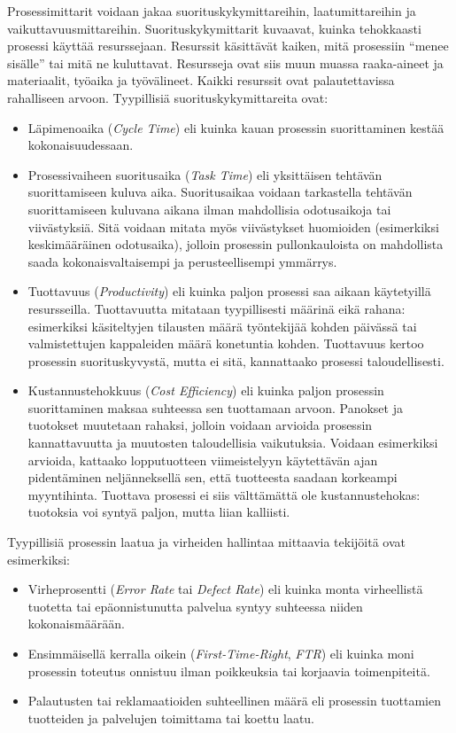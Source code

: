 \documentclass[
  finnish,
  letterpaper,
  DIV=11,
  numbers=noendperiod,
  oneside]{scrreprt}
\providecommand{\tightlist}{%
  \setlength{\itemsep}{0pt}\setlength{\parskip}{0pt}}
\begin{document}
Prosessimittarit voidaan jakaa suorituskykymittareihin, laatumittareihin
ja vaikuttavuusmittareihin. Suorituskykymittarit kuvaavat, kuinka
tehokkaasti prosessi käyttää resurssejaan. Resurssit käsittävät kaiken,
mitä prosessiin ``menee sisälle'' tai mitä ne kuluttavat. Resursseja
ovat siis muun muassa raaka-aineet ja materiaalit, työaika ja
työvälineet. Kaikki resurssit ovat palautettavissa rahalliseen arvoon.
Tyypillisiä suorituskykymittareita ovat:

\begin{itemize}
\tightlist
\item
  Läpimenoaika (\emph{Cycle Time}) eli kuinka kauan prosessin
  suorittaminen kestää kokonaisuudessaan.
\item
  Prosessivaiheen suoritusaika (\emph{Task Time}) eli yksittäisen
  tehtävän suorittamiseen kuluva aika. Suoritusaikaa voidaan tarkastella
  tehtävän suorittamiseen kuluvana aikana ilman mahdollisia odotusaikoja
  tai viivästyksiä. Sitä voidaan mitata myös viivästykset huomioiden
  (esimerkiksi keskimääräinen odotusaika), jolloin prosessin
  pullonkauloista on mahdollista saada kokonaisvaltaisempi ja
  perusteellisempi ymmärrys.
\item
  Tuottavuus (\emph{Productivity}) eli kuinka paljon prosessi saa aikaan
  käytetyillä resursseilla. Tuottavuutta mitataan tyypillisesti määrinä
  eikä rahana: esimerkiksi käsiteltyjen tilausten määrä työntekijää
  kohden päivässä tai valmistettujen kappaleiden määrä konetuntia
  kohden. Tuottavuus kertoo prosessin suorituskyvystä, mutta ei sitä,
  kannattaako prosessi taloudellisesti.
\item
  Kustannustehokkuus (\emph{Cost Efficiency}) eli kuinka paljon
  prosessin suorittaminen maksaa suhteessa sen tuottamaan arvoon.
  Panokset ja tuotokset muutetaan rahaksi, jolloin voidaan arvioida
  prosessin kannattavuutta ja muutosten taloudellisia vaikutuksia.
  Voidaan esimerkiksi arvioida, kattaako lopputuotteen viimeistelyyn
  käytettävän ajan pidentäminen neljänneksellä sen, että tuotteesta
  saadaan korkeampi myyntihinta. Tuottava prosessi ei siis välttämättä
  ole kustannustehokas: tuotoksia voi syntyä paljon, mutta liian
  kalliisti.
\end{itemize}

Tyypillisiä prosessin laatua ja virheiden hallintaa mittaavia tekijöitä
ovat esimerkiksi:

\begin{itemize}
\tightlist
\item
  Virheprosentti (\emph{Error Rate} tai \emph{Defect Rate}) eli kuinka
  monta virheellistä tuotetta tai epäonnistunutta palvelua syntyy
  suhteessa niiden kokonaismäärään.
\item
  Ensimmäisellä kerralla oikein (\emph{First-Time-Right}, \emph{FTR})
  eli kuinka moni prosessin toteutus onnistuu ilman poikkeuksia tai
  korjaavia toimenpiteitä.
\item
  Palautusten tai reklamaatioiden suhteellinen määrä eli prosessin
  tuottamien tuotteiden ja palvelujen toimittama tai koettu laatu.
\end{itemize}
\end{document}
